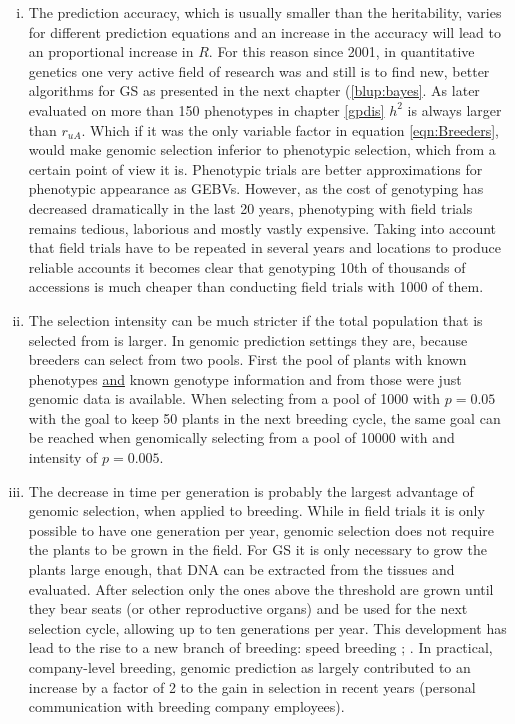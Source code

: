 \begin{enumerate}[(i)]
\item The prediction accuracy, which is usually smaller than the heritability, varies for
  different prediction equations and an increase in the accuracy will lead to an
  proportional increase in $R$. For this reason since 2001, in quantitative genetics one
  very active field of research was and still is to find new, better algorithms for GS as
  presented in the next chapter (\ref{blup:bayes}. As later evaluated on more than 150
  phenotypes in chapter \ref{gpdis} $h^2$ is always larger than $r_{uA}$. Which if it was
  the only variable factor in equation \ref{eqn:Breeders}, would make genomic selection
  inferior to phenotypic selection, which from a certain point of view it is. Phenotypic
  trials are better approximations for phenotypic appearance as GEBVs. However, as the
  cost of genotyping has decreased dramatically in the last 20 years, phenotyping with
  field trials remains tedious, laborious and mostly vastly expensive. Taking into account
  that field trials have to be repeated in several years and locations to produce reliable
  accounts it becomes clear that genotyping 10th of thousands of accessions is much
  cheaper than conducting field trials with 1000 of them.
\item The selection intensity can be much stricter if the total population that is
  selected from is larger. In genomic prediction settings they are, because breeders can
  select from two pools. First the pool of plants with known phenotypes \underline{and}
  known genotype information and from those were just genomic data is available. When
  selecting from a pool of 1000 with $p=0.05$ with the goal to keep 50 plants in the next
  breeding cycle, the same goal can be reached when genomically selecting from a pool of
  10000 with and intensity of $p=0.005$.
\item The decrease in time per generation is probably the largest advantage of genomic
  selection, when applied to breeding. While in field trials it is only possible to have
  one generation per year, genomic selection does not require the plants to be grown in
  the field. For GS it is only necessary to grow the plants large enough, that DNA can be
  extracted from the tissues and evaluated. After selection only the ones above the
  threshold are grown until they bear seats (or other reproductive organs) and be used
  for the next selection cycle, allowing up to ten generations per year. This development
  has lead to the rise to a new branch of breeding: speed breeding \cite{ghosh2018speed};
  \cite{watson2018speed}. In practical, company-level breeding, genomic prediction as largely
  contributed to an increase by a factor of 2 to the gain in selection in recent years
  (personal communication with breeding company employees).
\end{enumerate}

